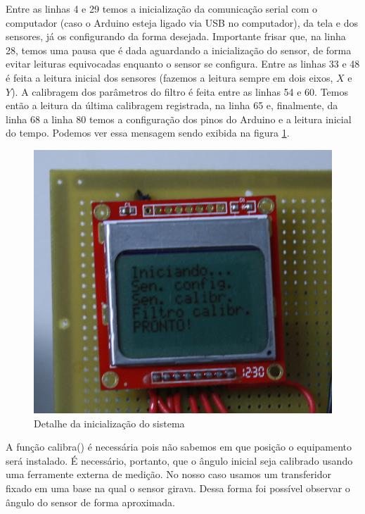 \documentclass[a4paper,12pt]{article}
\begin{document}
Entre as linhas 4 e 29 temos a inicialização da comunicação serial com o computador (caso o Arduino esteja ligado via USB no computador), da tela e dos sensores, já os configurando da forma desejada. Importante frisar que, na linha 28, temos uma pausa que é dada aguardando a inicialização do sensor, de forma evitar leituras equivocadas enquanto o sensor se configura. Entre as linhas 33 e 48 é feita a leitura inicial dos sensores (fazemos a leitura sempre em dois eixos, $X$ e $Y$). A calibragem dos parâmetros do filtro é feita entre as linhas 54 e 60. Temos então a leitura da última calibragem registrada, na linha 65 e, finalmente, da linha 68 a linha 80 temos a configuração dos pinos do Arduino e a leitura inicial do tempo. Podemos ver essa mensagem sendo exibida na figura \ref{inicia}.

\begin{figure}[H]
\centering
\includegraphics[width=.5\textwidth]{img/inicia.jpg}
\caption{Detalhe da inicialização do sistema}
\label{inicia}
\end{figure}

A função calibra() é necessária pois não sabemos em que posição o equipamento será instalado. É necessário, portanto, que o ângulo inicial seja calibrado usando uma ferramente externa de medição. No nosso caso usamos um transferidor fixado em uma base na qual o sensor girava. Dessa forma foi possível observar o ângulo do sensor de forma aproximada.
\end{document}
